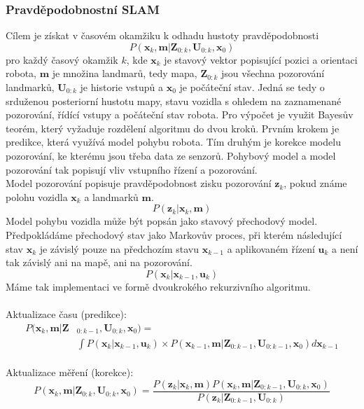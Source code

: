 \documentclass[12pt]{article}
\begin{document}
\subsubsection{Pravděpodobnostní SLAM}
Cílem je získat v časovém okamžiku k odhadu hustoty pravděpodobnosti
\begin{equation}
	P(\textbf{x}_k,\textbf{m}|\textbf{Z}_{0:k},\textbf{U}_{0:k},\textbf{x}_0)
\end{equation}
pro každý časový okamžik ${k}$, kde $\textbf{x}_k$ je stavový vektor popisující pozici a orientaci robota, $\textbf{m}$ je množina landmarů, tedy mapa, $\textbf{Z}_{0:k}$ jsou všechna pozorování landmarků, $\textbf{U}_{0:k}$ je historie vstupů a $\textbf{x}_0$ je počáteční stav. Jedná se tedy o srduženou posteriorní hustotu mapy, stavu vozidla s ohledem na zaznamenané pozorování, řídící vstupy a  počáteční stav robota. Pro výpočet je využit Bayesův teorém, který vyžaduje rozdělení algoritmu do dvou kroků. Prvním krokem je predikce, která využívá model pohybu robota. Tím druhým je korekce modelu pozorování, ke kterému jsou třeba data ze senzorů. Pohybový model a model pozorování tak popisují vliv vstupního řízení a pozorování.\\

\indent Model pozorování popisuje pravděpodobnost zisku pozorování $\textbf{z}_k$, pokud známe polohu vozidla $\textbf{x}_k$ a landmarků $\textbf{m}$.
\begin{equation}
	P(\textbf{z}_k|\textbf{x}_k,\textbf{m})
\end{equation} 
\indent Model pohybu vozidla může být popsán jako stavový přechodový model. \\Předpokládáme přechodový stav jako Markovův proces, při kterém následující stav $\textbf{x}_k$ je závislý pouze na předchozím stavu $\textbf{x}_{k-1}$ a aplikovaném řízení $\textbf{u}_k$ a není tak závislý ani na mapě, ani na pozorování.
\begin{equation}
	P(\textbf{x}_k|\textbf{x}_{k-1},\textbf{u}_k)
\end{equation}
Máme tak implementaci ve formě dvoukrokého rekurzivního algoritmu.\\
\\
Aktualizace času (predikce):
\begin{equation}
	\begin{split}
	P(\textbf{x}_k,\textbf{m}|\textbf{Z}&_{0:k-1},\textbf{U}_{0:k},\textbf{x}_0)=\\&\int P(\textbf{x}_k|\textbf{x}_{k-1},\textbf{u}_k)\times P(\textbf{x}_{k-1},\textbf{m}|\textbf{Z}_{0:k-1},\textbf{U}_{0:k-1},\textbf{x}_0)d\textbf{x}_{k-1}
	\end{split}
\end{equation}
\\
Aktualizace měření (korekce):
\begin{equation}
	P(\textbf{x}_k,\textbf{m}|\textbf{Z}_{0:k},\textbf{U}_{0:k},\textbf{x}_0)=\frac{P(\textbf{z}_k|\textbf{x}_k,\textbf{m})P(\textbf{x}_k,\textbf{m}|\textbf{Z}_{0:k-1},\textbf{U}_{0:k},\textbf{x}_0)}{P(\textbf{z}_k|\textbf{Z}_{0:k-1},\textbf{U}_{0:k})}
\end{equation}
\end{document}
